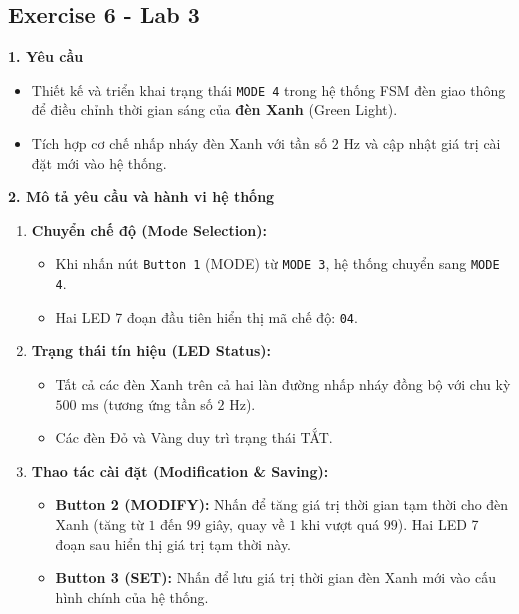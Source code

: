 \subsection{Exercise 6 - Lab 3}

\textbf{1. Yêu cầu}
\begin{itemize}
    \item Thiết kế và triển khai trạng thái \texttt{MODE 4} trong hệ thống FSM đèn giao thông để điều chỉnh thời gian sáng của \textbf{đèn Xanh} (Green Light).
    \item Tích hợp cơ chế nhấp nháy đèn Xanh với tần số $2\text{ Hz}$ và cập nhật giá trị cài đặt mới vào hệ thống.
\end{itemize}

\textbf{2. Mô tả yêu cầu và hành vi hệ thống}
\begin{enumerate}
    \item \textbf{Chuyển chế độ (Mode Selection):} 
    \begin{itemize}
        \item Khi nhấn nút \texttt{Button 1} (MODE) từ \texttt{MODE 3}, hệ thống chuyển sang \texttt{MODE 4}.
        \item Hai LED 7 đoạn đầu tiên hiển thị mã chế độ: \texttt{04}.
    \end{itemize}
    
    \item \textbf{Trạng thái tín hiệu (LED Status):}
    \begin{itemize}
        \item Tất cả các đèn Xanh trên cả hai làn đường nhấp nháy đồng bộ với chu kỳ $500\text{ ms}$ (tương ứng tần số $2\text{ Hz}$).
        \item Các đèn Đỏ và Vàng duy trì trạng thái TẮT.
    \end{itemize}
    
    \item \textbf{Thao tác cài đặt (Modification \& Saving):}
    \begin{itemize}
        \item \textbf{Button 2 (MODIFY):} Nhấn để tăng giá trị thời gian tạm thời cho đèn Xanh (tăng từ $1$ đến $99$ giây, quay về $1$ khi vượt quá $99$). Hai LED 7 đoạn sau hiển thị giá trị tạm thời này.
        \item \textbf{Button 3 (SET):} Nhấn để lưu giá trị thời gian đèn Xanh mới vào cấu hình chính của hệ thống.
    \end{itemize}
\end{enumerate}

